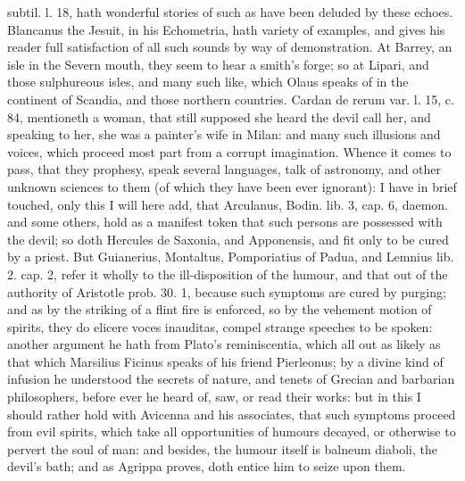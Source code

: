 {subtil. l. 18, hath wonderful stories of such as have been deluded by
these echoes. Blancanus the Jesuit, in his Echometria, hath variety of
examples, and gives his reader full satisfaction of all such sounds by
way of demonstration. At Barrey, an isle in the Severn mouth,
they seem to hear a smith's forge; so at Lipari, and those sulphureous
isles, and many such like, which Olaus speaks of in the continent of
Scandia, and those northern countries. Cardan de rerum var. l. 15, c.
84, mentioneth a woman, that still supposed she heard the devil call
her, and speaking to her, she was a painter's wife in Milan: and many
such illusions and voices, which proceed most part from a corrupt
imagination.
Whence it comes to pass, that they prophesy, speak several languages, talk of astronomy, and other unknown sciences to them (of which they have been ever ignorant): I have in brief touched, only this I will here add, that Arculanus, Bodin. lib. 3, cap. 6, daemon. and some others,  hold as a manifest token that such persons are possessed with the devil; so doth Hercules de Saxonia, and Apponensis, and fit only to be cured by a priest. But Guianerius, Montaltus, Pomporiatius of Padua, and Lemnius lib. 2. cap. 2, refer it wholly to the ill-disposition of the humour, and that out of the authority of Aristotle prob. 30. 1, because such symptoms are cured by purging; and as by the striking of a flint fire is enforced, so by the vehement motion of spirits, they do elicere voces inauditas, compel strange speeches to be spoken: another argument he hath from Plato's reminiscentia, which all out as likely as that which Marsilius Ficinus speaks of his friend Pierleonus; by a divine kind of infusion he understood the secrets of nature, and tenets of Grecian and barbarian philosophers, before ever he heard of, saw, or read their works: but in this I should rather hold with Avicenna and his associates, that such symptoms proceed from evil spirits, which take all opportunities of humours decayed, or otherwise to pervert the soul of man: and besides, the humour itself is balneum diaboli, the devil's bath; and as Agrippa proves, doth entice him to seize upon them.
}
